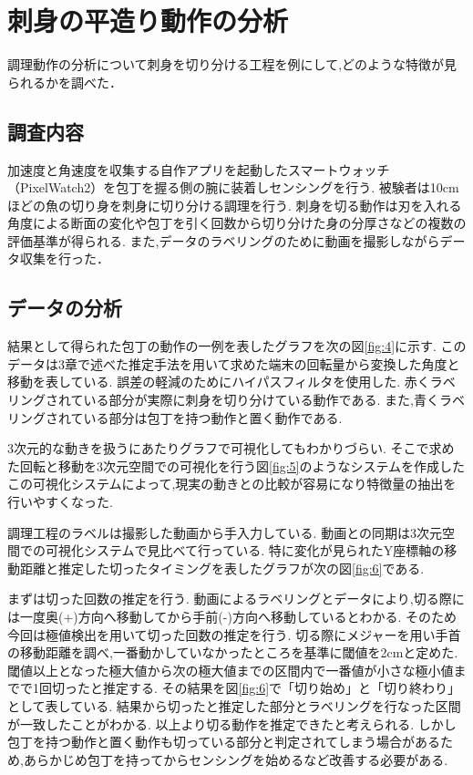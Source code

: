 \section{刺身の平造り動作の分析}
調理動作の分析について刺身を切り分ける工程を例にして,どのような特徴が見られるかを調べた．
\subsection{調査内容}
加速度と角速度を収集する自作アプリを起動したスマートウォッチ（PixelWatch2）を包丁を握る側の腕に装着しセンシングを行う.
被験者は10cmほどの魚の切り身を刺身に切り分ける調理を行う.
刺身を切る動作は刃を入れる角度による断面の変化や包丁を引く回数から切り分けた身の分厚さなどの複数の評価基準が得られる.
また,データのラベリングのために動画を撮影しながらデータ収集を行った．
\subsection{データの分析}

結果として得られた包丁の動作の一例を表したグラフを次の図\ref{fig:4}に示す.
このデータは3章で述べた推定手法を用いて求めた端末の回転量から変換した角度と移動を表している.
誤差の軽減のためにハイパスフィルタを使用した.
赤くラベリングされている部分が実際に刺身を切り分けている動作である.
また,青くラベリングされている部分は包丁を持つ動作と置く動作である.

3次元的な動きを扱うにあたりグラフで可視化してもわかりづらい.
そこで求めた回転と移動を3次元空間での可視化を行う図\ref{fig:5}のようなシステムを作成した
この可視化システムによって,現実の動きとの比較が容易になり特徴量の抽出を行いやすくなった.

調理工程のラベルは撮影した動画から手入力している.
動画との同期は3次元空間での可視化システムで見比べて行っている.
特に変化が見られたY座標軸の移動距離と推定した切ったタイミングを表したグラフが次の図\ref{fig:6}である.


まずは切った回数の推定を行う.
動画によるラベリングとデータにより,切る際には一度奥(+)方向へ移動してから手前(-)方向へ移動しているとわかる.
そのため今回は極値検出を用いて切った回数の推定を行う.
切る際にメジャーを用い手首の移動距離を調べ,一番動かしていなかったところを基準に閾値を2cmと定めた.
閾値以上となった極大値から次の極大値までの区間内で一番値が小さな極小値までで1回切ったと推定する.
その結果を図\ref{fig:6}で「切り始め」と「切り終わり」として表している.
結果から切ったと推定した部分とラベリングを行なった区間が一致したことがわかる.
以上より切る動作を推定できたと考えられる.
しかし包丁を持つ動作と置く動作も切っている部分と判定されてしまう場合があるため,あらかじめ包丁を持ってからセンシングを始めるなど改善する必要がある.

